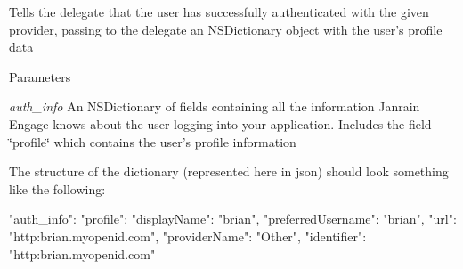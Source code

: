 \label{interfacecom_1_1janrain_1_1android_1_1engage_1_1_j_r_engage_delegate_ab629bcee7bdbdeaa868460d82361733d}
\label{interfacecom_1_1janrain_1_1android_1_1engage_1_1_j_r_engage_delegate_authDidSucceed}
\hypertarget{interfacecom_1_1janrain_1_1android_1_1engage_1_1_j_r_engage_delegate_authDidSucceed}{}


Tells the delegate that the user has successfully authenticated with the given provider, passing to the delegate an {\ttfamily NSDictionary} object with the user's profile data


\begin{DoxyParams}{Parameters}
\item[{\em auth\_\-info}]An {\ttfamily NSDictionary} of fields containing all the information Janrain Engage knows about the user logging into your application. Includes the field \char`\"{}profile\char`\"{} which contains the user's profile information\end{DoxyParams}
The structure of the dictionary (represented here in json) should look something like the following: 
\begin{DoxyCode}
     "auth_info":
     {
       "profile": 
       {
         "displayName": "brian",
         "preferredUsername": "brian",
         "url": "http:\/\/brian.myopenid.com\/",
         "providerName": "Other",
         "identifier": "http:\/\/brian.myopenid.com\/"
       }
     }
\end{DoxyCode}



